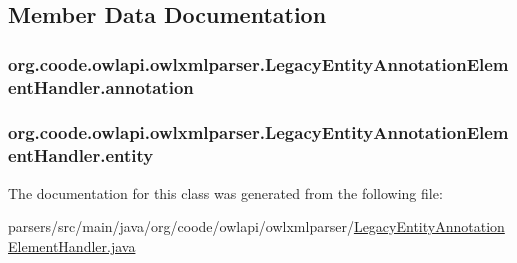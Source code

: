 \subsection{Member Data Documentation}
\hypertarget{classorg_1_1coode_1_1owlapi_1_1owlxmlparser_1_1_legacy_entity_annotation_element_handler_aa1477f4432cc3038e2b9fdd5a632e738}{
\subsubsection[{annotation}]{ org.\-coode.\-owlapi.\-owlxmlparser.\-Legacy\-Entity\-Annotation\-Element\-Handler.\-annotation\hspace{0.3cm}{\ttfamily [private]}}}\label{classorg_1_1coode_1_1owlapi_1_1owlxmlparser_1_1_legacy_entity_annotation_element_handler_aa1477f4432cc3038e2b9fdd5a632e738}
\hypertarget{classorg_1_1coode_1_1owlapi_1_1owlxmlparser_1_1_legacy_entity_annotation_element_handler_a9c7a7b6518ca448563afc2cb52d01a92}{
\subsubsection[{entity}]{ org.\-coode.\-owlapi.\-owlxmlparser.\-Legacy\-Entity\-Annotation\-Element\-Handler.\-entity\hspace{0.3cm}{\ttfamily [private]}}}\label{classorg_1_1coode_1_1owlapi_1_1owlxmlparser_1_1_legacy_entity_annotation_element_handler_a9c7a7b6518ca448563afc2cb52d01a92}


The documentation for this class was generated from the following file\-:\begin{DoxyCompactItemize}
\item 
parsers/src/main/java/org/coode/owlapi/owlxmlparser/\hyperlink{_legacy_entity_annotation_element_handler_8java}{Legacy\-Entity\-Annotation\-Element\-Handler.\-java}\end{DoxyCompactItemize}
